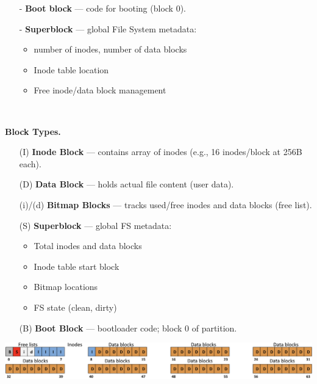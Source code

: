 \documentclass[8pt]{extarticle}
\begin{document}
\begin{minipage}[htp]{0.5\textwidth}
\begin{minipage}[t]{0.55\textwidth}
\begin{itemize}[noitemsep,topsep=0pt]
    \item[-] \textbf{Boot block} — code for booting (block 0).
    \item[-] \textbf{Superblock} — global File System metadata:
        \begin{itemize}[noitemsep,topsep=0pt]
            \item number of inodes, number of data blocks
            \item Inode table location
            \item Free inode/data block management
        \end{itemize}
\end{itemize}
\end{minipage}\\[2px]
\begin{minipage}[htp]{1\textwidth}
\noindent\textbf{Block Types.}\\
\hspace*{-35px}
\begin{minipage}[t]{0.5\textwidth}
\begin{itemize}[noitemsep,topsep=0pt]
    \item[] (I) \textbf{Inode Block} — contains array of inodes (e.g., 16 inodes/block at 256B each).
    \item[] (D) \textbf{Data Block} — holds actual file content (user data).
    \item[] (i)/(d) \textbf{Bitmap Blocks} — tracks used/free inodes and data blocks (free list).
\end{itemize}
\end{minipage}%
\hspace*{-10px}
\begin{minipage}[t]{0.5\textwidth}
\begin{itemize}[noitemsep,topsep=0pt]
    \item[(S)] \textbf{Superblock} — global FS metadata:
        \begin{itemize}[noitemsep,topsep=0pt]
            \item Total inodes and data blocks
            \item Inode table start block
            \item Bitmap locations
            \item FS state (clean, dirty)
        \end{itemize}
    \item[(B)] \textbf{Boot Block} — bootloader code; block 0 of partition.
\end{itemize}
\end{minipage}
\includegraphics[width=1\textwidth]{images/blocks.png}
\end{minipage}
\end{minipage}
\end{document}
